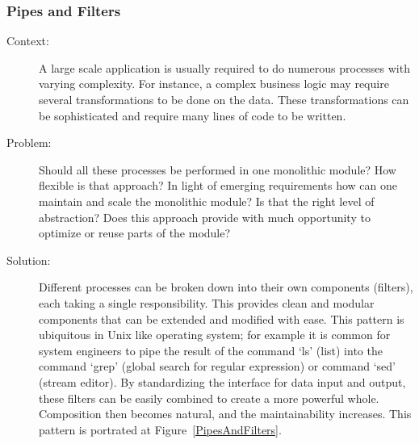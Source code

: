 \documentclass{bmcart}
\begin{document}



\subsubsection{Pipes and Filters}

\begin{description}
  \item[Context:] A large scale application is usually required to do numerous processes with varying complexity. For instance, a complex business logic may require several transformations to be done on the data. These transformations can be sophisticated and require many lines of code to be written.
  \item[Problem:] Should all these processes be performed in one monolithic module? How flexible is that approach? In light of emerging requirements how can one maintain and scale the monolithic module? Is that the right level of abstraction? Does this approach provide with much opportunity to optimize or reuse parts of the module? 
  \item[Solution:] Different processes can be broken down into their own components (filters), each taking a single responsibility. This provides clean and modular components that can be extended and modified with ease. This pattern is ubiquitous in Unix like operating system; for example it is common for system engineers to pipe the result of the command `ls' (list) into the command `grep' (global search for regular expression) or command `sed' (stream editor). By standardizing the interface for data input and output, these filters can be easily combined to create a more powerful whole. Composition then becomes natural, and the maintainability increases. This pattern is portrated at Figure~\ref{PipesAndFilters}.   
\end{description}
\end{document}
